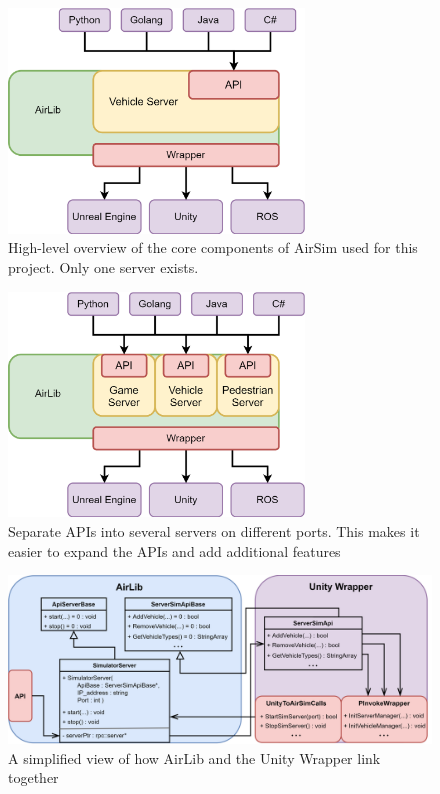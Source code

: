 \begin{figure}[H]
    \centering
    \includegraphics[width=0.7\textwidth]{05_AnalysisAndDesign/Diagrams/OriginalOverview.png}
    \caption{High-level overview of the core components of AirSim used for this project. Only one server exists.}
    \label{ADA:Figure:OriginalOverview}
    
\end{figure}

\begin{figure}[H]
    \centering
    \includegraphics[width=0.7\textwidth]{05_AnalysisAndDesign/Diagrams/UpdatedOverview.png}
    \caption{Separate APIs into several servers on different ports. This makes it easier to expand the APIs and add additional features}
\end{figure}

\begin{figure}[H]
    \centering
    \includegraphics[width=1\textwidth]{05_AnalysisAndDesign/Diagrams/UnityWrapper2.png}
    \caption{A simplified view of how AirLib and the Unity Wrapper link together}
\end{figure}

